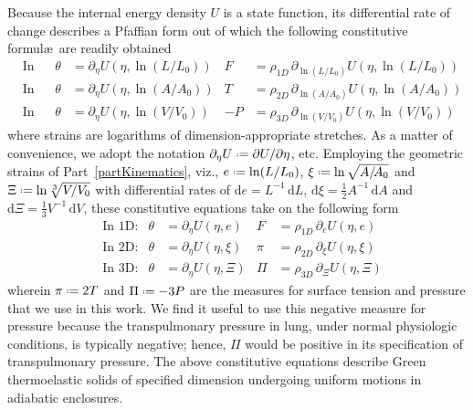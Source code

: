 Because the internal energy density $U$ is a state function, its differential rate of change describes a Pfaffian form \cite{Caratheodory09} out of which the following constitutive formul\ae\ are readily obtained
\begin{subequations}
    \label{GreenElasticCEs}
    \begin{align}
    \mbox{} & \text{In 1D:} & 
    \theta & = \partial_{\eta} U ( \eta , \ln (L/L_0)) &
    F & = \rho_{1D} \, \partial_{\ln(L/L_0)} U ( \eta , \ln (L/L_0) ) \\
    \mbox{} & \text{In 2D:} &
    \theta & = \partial_{\eta} U ( \eta , \ln (A / \! A_0) ) &
    T & = \rho_{2D} \, \partial_{\ln (A / \! A_0)} U ( \eta , \ln (A / A_0) ) \\
    \mbox{} & \text{In 3D:} &
    \theta & = \partial_{\eta} U ( \eta , \ln (V \! / V_0) ) &
    -P & = \rho_{3D} \, \partial_{\ln (V \! / V_0)} U ( \eta , \ln (V \! / V_0) )
    \end{align}
\end{subequations}
where strains are logarithms of dimension-appropriate stretches.  As a matter of convenience, we adopt the notation $\partial_{\eta} U \defeq \partial U / \partial \eta$, etc.  Employing the geometric strains of Part~\ref{partKinematics}, viz., $e \defeq \ln ( L / L_0 )$, $\xi \defeq \ln \sqrt{ A / \! A_0 }$ and $\Xi \defeq \ln \sqrt[3]{V \! / V_0}$ with differential rates of $\mathrm{d} e = L^{-1} \, \mathrm{d}L$, $\mathrm{d} \xi = \tfrac{1}{2} A^{-1} \, \mathrm{d}A$ and $\mathrm{d} \Xi = \tfrac{1}{3} V^{-1} \, \mathrm{d}V$, these constitutive equations take on the following form
\begin{subequations}
    \label{uniformCEs}
    \begin{align}
    \mbox{} & \text{In 1D:} & 
    \theta & = \partial_{\eta} U ( \eta , e) &
    F & = \rho_{1D} \, \partial_e U ( \eta , e ) \\
    \mbox{} & \text{In 2D:} &
    \theta & = \partial_{\eta} U ( \eta , \xi ) &
    \pi & = \rho_{2D} \, \partial_{\xi} U ( \eta , \xi ) \\
    \mbox{} & \text{In 3D:} &
    \theta & = \partial_{\eta} U ( \eta , \Xi ) &
    \Pi & = \rho_{3D} \, \partial_{\Xi} U ( \eta , \Xi )
    \end{align}
\end{subequations}
wherein $\pi \defeq 2T$ and $\Pi \defeq -3P$ are the measures for surface tension and pressure that we use in this work.  We find it useful to use this negative measure for pressure because the transpulmonary pressure in lung, under normal physiologic conditions, is typically negative; hence, $\Pi$ would be positive in its specification of transpulmonary pressure.  The above constitutive equations describe Green thermo\-elastic solids of specified dimension undergoing uniform motions in adiabatic enclosures.


